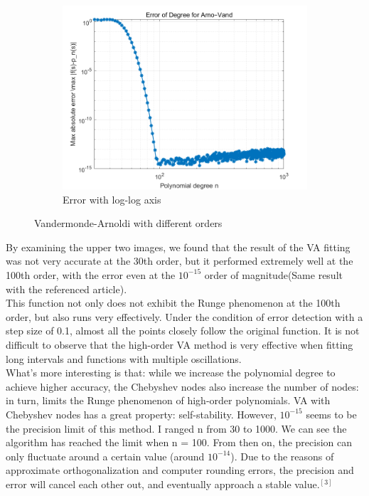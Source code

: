 \documentclass[11pt]{article}
\begin{document}
\begin{figure}[H]
\begin{subfigure}[t]{0.58\textwidth}
    \includegraphics[width=\textwidth]{ErrorVA.png}
    \caption{Error with log-log axis}
    \label{fig:nev_small1}
  \end{subfigure}
  \caption{Vandermonde-Arnoldi with different orders}
  \label{fig:nev_compare11}
\end{figure}
    
  
\FloatBarrier

By examining the upper two images, we found that the result of the VA fitting was not very accurate at the 30th order, 
but it performed extremely well at the 100th order, with the error even at the $10^{-15}$ order of magnitude(Same result with the referenced article).\\
This function not only does not exhibit the Runge phenomenon at the 100th order, but also runs very effectively. 
Under the condition of error detection with a step size of 0.1, almost all the points closely follow the original function. 
It is not difficult to observe that the high-order VA method is very effective when fitting long intervals and functions with 
multiple oscillations. \\
What's more interesting is that: while we increase the polynomial degree to achieve higher accuracy, the Chebyshev nodes also 
increase the number of nodes: in turn, limits the Runge phenomenon of high-order polynomials. VA with Chebyshev nodes has a great property: self-stability.
However, $10^{-15}$ seems to be the precision limit of this method. I ranged n from 30 to 1000. We can see the algorithm has reached the limit when n = 100. From then on, 
the precision can only fluctuate around a certain value (around $10^{-14}$). Due to the reasons of approximate orthogonalization and computer 
rounding errors, the precision and error will cancel each other out, and eventually approach a stable value.$^{[3]}$
\end{document}
